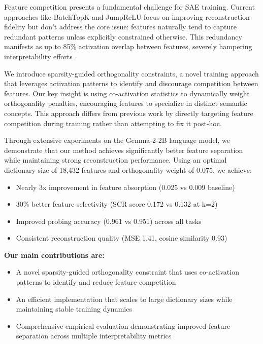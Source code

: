 \documentclass{article} %
\begin{document}
Feature competition presents a fundamental challenge for SAE training. Current approaches like BatchTopK \cite{bussmannBatchTopKSparseAutoencoders2024} and JumpReLU \cite{rajamanoharanJumpingAheadImproving2024} focus on improving reconstruction fidelity but don't address the core issue: features naturally tend to capture redundant patterns unless explicitly constrained otherwise. This redundancy manifests as up to 85\% activation overlap between features, severely hampering interpretability efforts \cite{chaninAbsorptionStudyingFeature2024}.

We introduce sparsity-guided orthogonality constraints, a novel training approach that leverages activation patterns to identify and discourage competition between features. Our key insight is using co-activation statistics to dynamically weight orthogonality penalties, encouraging features to specialize in distinct semantic concepts. This approach differs from previous work by directly targeting feature competition during training rather than attempting to fix it post-hoc.

Through extensive experiments on the Gemma-2-2B language model, we demonstrate that our method achieves significantly better feature separation while maintaining strong reconstruction performance. Using an optimal dictionary size of 18,432 features and orthogonality weight of 0.075, we achieve:
\begin{itemize}
    \item Nearly 3x improvement in feature absorption (0.025 vs 0.009 baseline)
    \item 30\% better feature selectivity (SCR score 0.172 vs 0.132 at k=2)
    \item Improved probing accuracy (0.961 vs 0.951) across all tasks
    \item Consistent reconstruction quality (MSE 1.41, cosine similarity 0.93)
\end{itemize}

\noindent\textbf{Our main contributions are:}
\begin{itemize}
    \item A novel sparsity-guided orthogonality constraint that uses co-activation patterns to identify and reduce feature competition
    \item An efficient implementation that scales to large dictionary sizes while maintaining stable training dynamics
    \item Comprehensive empirical evaluation demonstrating improved feature separation across multiple interpretability metrics
\end{itemize}
\end{document}

